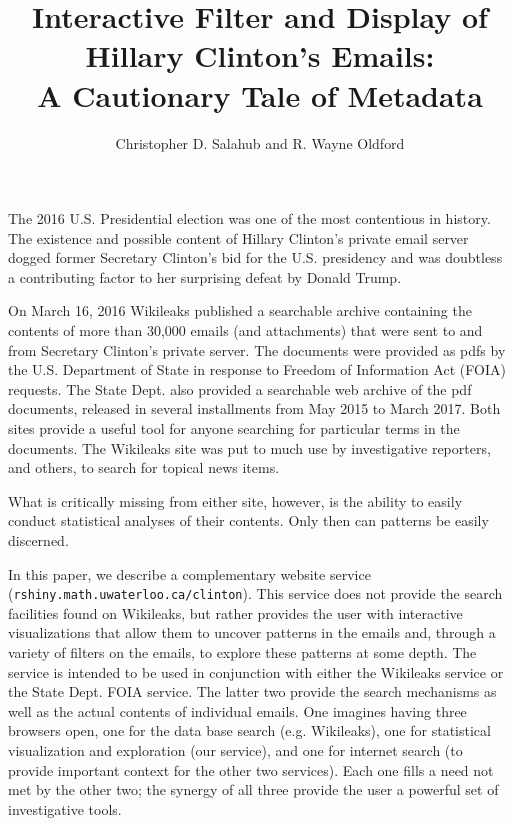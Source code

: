 \documentclass[journal]{vgtc}                %
\title{Interactive Filter and Display of Hillary Clinton's Emails: \\A Cautionary Tale of Metadata}
\author{Christopher D. Salahub and R. Wayne Oldford}
\begin{document}
\maketitle
The 2016 U.S. Presidential election was one of the most contentious in history.  The existence and possible content of Hillary Clinton's private email server dogged former Secretary Clinton's bid for the U.S. presidency and was doubtless a contributing factor to her surprising defeat by Donald Trump.

On March 16, 2016 Wikileaks  published a searchable archive \cite{Wikileaks} containing the contents of more than 30,000 emails (and attachments) that were sent to and from Secretary Clinton's private server.  The documents were provided as pdfs by the U.S. Department of State in response to Freedom of Information Act (FOIA) \cite{FOIA} requests.  The State Dept. also provided a searchable web archive of the pdf documents, released in several installments from May 2015 to March 2017\cite{StateDeptFOIA}.   Both sites provide a  useful tool for anyone searching for particular terms in the documents.  The Wikileaks site was put to much use by investigative reporters, and others, to search for topical news items.

What is critically missing from either site, however, is the ability to easily conduct statistical analyses of their contents.  Only then can patterns be easily discerned.  

In this paper, we describe a complementary website service (\texttt{rshiny.math.uwaterloo.ca/clinton}).  This service does not provide the search facilities found on Wikileaks, but rather provides the user with interactive visualizations that allow them to uncover patterns in the emails and, through a variety of filters on the emails,  to explore these patterns at some depth.  The service is intended to be used in conjunction with either the Wikileaks service or the State Dept. FOIA service.   The latter two provide the search mechanisms as well as the actual contents of individual emails.  One imagines having three browsers open, one for the data base search (e.g. Wikileaks), one for statistical visualization and exploration (our service), and one for internet search (to provide important context for the other two services). Each one fills a need not met by the other two; the synergy of all three provide the user a powerful set of investigative tools.
\end{document}
